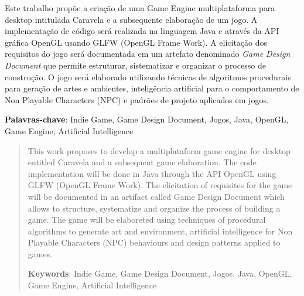 \documentclass[12pt, 
openright, 
oneside, 
a4paper,    
brazil]{facom-ufu-abntex2}
\begin{document}
\begin{resumo} 

Este trabalho propõe a criação de uma Game Engine multiplataforma para desktop intitulada Caravela e a subsequente elaboração de um jogo.
A implementação de código será realizada na linguagem Java e através da API gráfica OpenGL usando GLFW (OpenGL Frame Work). 
A elicitação dos requisitos do jogo será documentada em um artefato denominado \textit{Game Design Document} que permite estruturar, sistematizar e organizar 
o processo de construção.
O jogo será elaborado utilizando técnicas de algoritmos procedurais para geração de artes e ambientes, inteligência artificial para o comportamento de Non Playable Characters (NPC) e padrões de projeto aplicados em jogos.
 
 \vspace{\onelineskip}
 \noindent
 \textbf{Palavras-chave}: Indie Game, Game Design Document, Jogos, Java, OpenGL, Game Engine, Artificial Intelligence
\end{resumo}

\begin{abstract} 
This work proposes to develop a multiplataform game engine for desktop entitled Caravela and a subsequent game elaboration. 
The code implementation will be done in Java through the API OpenGL using GLFW (OpenGL Frame Work).
The elicitation of requisites for the game will be documented in an artifact called Game Design Document which allows to structure, systematize and organize the process of building a game.
The game will be elaboreted using techniques of procedural algorithms to generate art and environment, artificial intelligence for Non Playable Characters (NPC) behaviours and design patterns applied to games.

 \vspace{\onelineskip}
    
 \noindent
 \textbf{Keywords}: Indie Game, Game Design Document, Jogos, Java, OpenGL, Game Engine, Artificial Intelligence %
\end{abstract}
\cleardoublepage


\listoffigures*
\cleardoublepage


\listoftables*
\cleardoublepage
\end{document}
